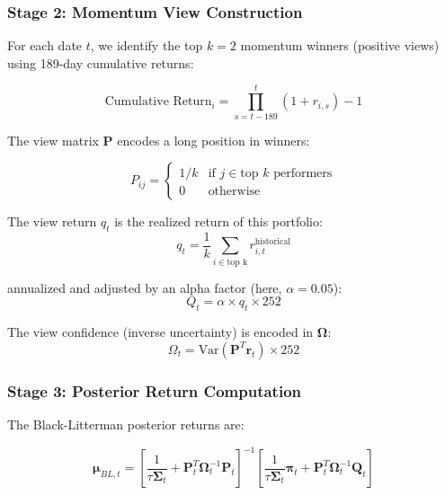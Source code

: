 \documentclass[12pt,a4paper]{article}
\begin{document}
\subsubsection{Stage 2: Momentum View Construction}

For each date $t$, we identify the top $k=2$ momentum winners (positive views) using 189-day cumulative returns:

\begin{equation}
\text{Cumulative Return}_i = \prod_{s=t-189}^{t} (1 + r_{i,s}) - 1
\end{equation}

The view matrix $\mathbf{P}$ encodes a long position in winners:

\begin{equation}
P_{ij} = \begin{cases}
1/k & \text{if } j \in \text{top } k \text{ performers} \\
0 & \text{otherwise}
\end{cases}
\end{equation}

The view return $q_t$ is the realized return of this portfolio:
\begin{equation}
q_t = \frac{1}{k} \sum_{i \in \text{top k}} r_{i,t}^{\text{historical}}
\end{equation}

annualized and adjusted by an alpha factor (here, $\alpha = 0.05$):
\begin{equation}
Q_t = \alpha \times q_t \times 252
\end{equation}

The view confidence (inverse uncertainty) is encoded in $\boldsymbol{\Omega}$:
\begin{equation}
\Omega_t = \text{Var}\left(\mathbf{P}^T \mathbf{r}_t\right) \times 252
\end{equation}

\subsubsection{Stage 3: Posterior Return Computation}

The Black-Litterman posterior returns are:

\begin{equation}
\boldsymbol{\mu}_{BL,t} = \left[\frac{1}{\tau \boldsymbol{\Sigma}_t} + \mathbf{P}_t^T \boldsymbol{\Omega}_t^{-1} \mathbf{P}_t\right]^{-1} \left[\frac{1}{\tau \boldsymbol{\Sigma}_t} \boldsymbol{\pi}_t + \mathbf{P}_t^T \boldsymbol{\Omega}_t^{-1} \mathbf{Q}_t\right]
\end{equation}
\end{document}
